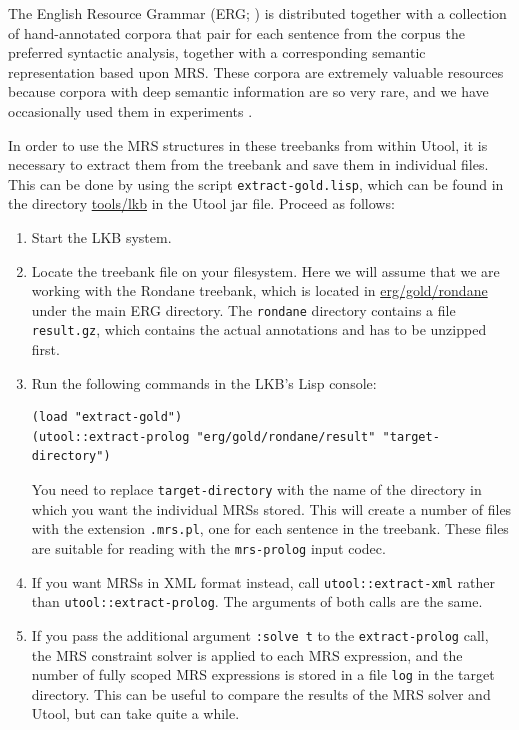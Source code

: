 The English Resource Grammar (ERG; )
is distributed together with a collection of hand-annotated corpora that pair for each sentence from the corpus
the preferred syntactic analysis, together with a corresponding
semantic representation based upon MRS. These corpora are extremely
valuable resources because corpora with deep semantic information are
so very rare, and we have occasionally used them in experiments
\cite{FucKolNieTha04,FliKolTha05}.

In order to use the MRS structures in these treebanks from within
Utool, it is necessary to extract them from the treebank and save them
in individual files. This can be done by using the script
\verb|extract-gold.lisp|, which can be found in the directory
\url{tools/lkb} in the Utool jar file. Proceed as follows:

\begin{enumerate}
\item Start the LKB system.
\item Locate the treebank file on your filesystem. Here we will assume
that we are working with the Rondane treebank, which is located in
\url{erg/gold/rondane} under the main ERG directory. The \verb|rondane| directory contains a file \verb|result.gz|, which contains the actual annotations and has to be unzipped first.
\item Run the following commands in the LKB's Lisp console:
\begin{verbatim}
(load "extract-gold")
(utool::extract-prolog "erg/gold/rondane/result" "target-directory")
\end{verbatim}
You need to replace \verb?target-directory? with the name of the
directory in which you want the individual MRSs stored. This will
create a number of files with the extension \verb?.mrs.pl?, one for
each sentence in the treebank. These files are suitable for reading
with the \verb?mrs-prolog? input codec.
\item If you want MRSs in XML format instead, call
\verb?utool::extract-xml? rather than
\verb?utool::extract-prolog?. The arguments of both calls are the
same. 
\item If you pass the additional argument \verb?:solve t? to the
\verb?extract-prolog? call, the MRS constraint solver is applied to
each MRS expression, and the number of fully scoped MRS expressions is
stored in a file \verb|log| in the target directory. This can be
useful to compare the results of the MRS solver and Utool, but can
take quite a while.
\end{enumerate}

